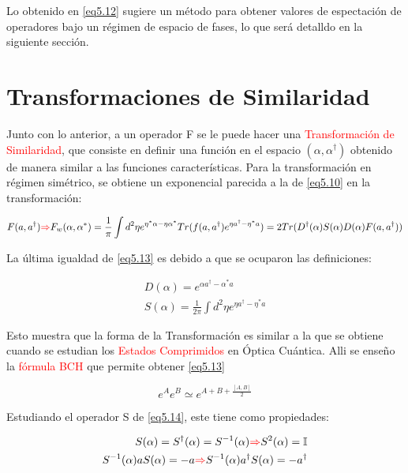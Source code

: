 \documentclass{book}
\begin{document}
Lo obtenido en \ref{eq5.12} sugiere un método para obtener valores de espectación de operadores bajo un régimen de espacio de fases, lo que será detalldo en la siguiente sección.

\section{Transformaciones de Similaridad}

Junto con lo anterior, a un operador F se le puede hacer una \textcolor{red}{Transformación de Similaridad}, que consiste en definir una función en el espacio $(\alpha,\alpha^\dag)$ obtenido de manera similar a las funciones características. Para la transformación en régimen simétrico, se obtiene un exponencial parecida a la de \ref{eq5.10} en la transformación:

\begin{equation}\label{eq5.13}F(a,a^\dag) \textcolor{red}{\Rightarrow} F_w(\alpha,\alpha^*)=\frac{1}{\pi} \int d^2 \eta e^{\eta^*\alpha-\eta\alpha^*}Tr(f(a,a^\dag)e^{\eta a^\dag -\eta^* a})=2Tr(D^\dag(\alpha)S(\alpha)D(\alpha)F(a,a^\dag))\end{equation}

La última igualdad de \ref{eq5.13} es debido a que se ocuparon las definiciones:

\begin{equation}\label{eq5.14}
\begin{aligned}
    D(\alpha)=e^{\alpha a^\dag-\alpha^* a}\\S(\alpha)=\frac{1}{2\pi} \int d^2\eta e^{\eta a^\dag-\eta^* a}
\end{aligned}
\end{equation}

Esto muestra que la forma de la Transformación es similar a la que se obtiene cuando se estudian los \textcolor{red}{Estados Comprimidos} en Óptica Cuántica. Alli se enseño la \textcolor{red}{fórmula BCH}  que permite obtener \ref{eq5.13}

\begin{equation}\label{eq5.15}e^{A}e^{B}\simeq e^{A+B+\frac{[A,B]}{2}}\end{equation}

Estudiando el operador S de \ref{eq5.14}, este tiene como propiedades:

\begin{equation}\label{eq5.16}\begin{aligned}
    S(\alpha)=S^\dag(\alpha)=S^{-1}(\alpha)\textcolor{red}{\Rightarrow} S^2(\alpha)=\mathbb{I} \\
    S^{-1}(\alpha)a S(\alpha)=-a \textcolor{red}{\Rightarrow} S^{-1}(\alpha)a^\dag S(\alpha)=-a^\dag
\end{aligned}\end{equation}
\end{document}
